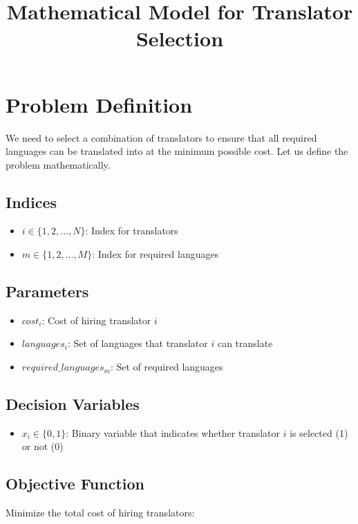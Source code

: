 \documentclass{article}
\begin{document}
\title{Mathematical Model for Translator Selection}
\author{}
\date{}
\maketitle

\section*{Problem Definition}

We need to select a combination of translators to ensure that all required languages can be translated into at the minimum possible cost. Let us define the problem mathematically.

\subsection*{Indices}
\begin{itemize}
    \item $i \in \{1, 2, \ldots, N\}$: Index for translators
    \item $m \in \{1, 2, \ldots, M\}$: Index for required languages
\end{itemize}

\subsection*{Parameters}
\begin{itemize}
    \item $cost_i$: Cost of hiring translator $i$
    \item $languages_i$: Set of languages that translator $i$ can translate
    \item $required\_languages_m$: Set of required languages
\end{itemize}

\subsection*{Decision Variables}
\begin{itemize}
    \item $x_i \in \{0, 1\}$: Binary variable that indicates whether translator $i$ is selected (1) or not (0)
\end{itemize}

\subsection*{Objective Function}
Minimize the total cost of hiring translators:
\end{document}
